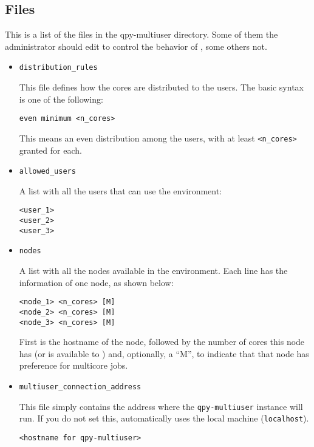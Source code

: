 \documentclass[a4paper,12pt]{article}
\begin{document}
\subsection{Files}\label{sec:admin_files}

This is a list of the files in the qpy-multiuser directory.
Some of them the administrator should edit to control the behavior of \qpy{}, some others not.

\begin{itemize}

\item \texttt{distribution\_rules}

  This file defines how the cores are distributed to the users.
  The basic syntax is one of the following:

  \begin{lstlisting}[style=FileStyle]
even minimum <n_cores>
  \end{lstlisting}

This means an even distribution among the users, with at least \texttt{<n\_cores>} granted for each.

\item \texttt{allowed\_users}

  A list with all the users that can use the \qpy{} environment:

  \begin{lstlisting}[style=FileStyle]
<user_1>
<user_2>
<user_3>
  \end{lstlisting}

\item \texttt{nodes}

  A list with all the nodes available in the \qpy{} environment.
  Each line has the information of one node, as shown below:

  \begin{lstlisting}[style=FileStyle]
<node_1> <n_cores> [M]
<node_2> <n_cores> [M]
<node_3> <n_cores> [M]
  \end{lstlisting}

  First is the hostname of the node, followed by the number of cores this node has (or is available to \qpy{}) and, optionally, a ``M'', to indicate that that node has preference for multicore jobs.
  
\item \texttt{multiuser\_connection\_address}

  This file simply contains the address where the \texttt{qpy-multiuser} instance will run.
  If you do not set this, \qpy{} automatically uses the local machine (\texttt{localhost}).
  \begin{lstlisting}[style=FileStyle]
<hostname for qpy-multiuser>
  \end{lstlisting}
  

\end{itemize}
\end{document}
